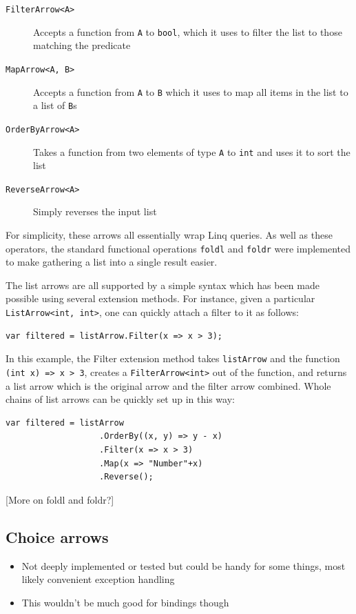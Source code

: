 \documentclass[12pt,twoside,notitlepage]{report}
\begin{document}
\begin{description}
	\item[\texttt{FilterArrow<A>}] Accepts a function from \texttt{A} to \texttt{bool}, which it uses to filter the list to those matching the predicate
	\item[\texttt{MapArrow<A, B>}] Accepts a function from \texttt{A} to \texttt{B} which it uses to map all items in the list to a list of \texttt{B}s
	\item[\texttt{OrderByArrow<A>}] Takes a function from two elements of type \texttt{A} to \texttt{int} and uses it to sort the list
	\item[\texttt{ReverseArrow<A>}] Simply reverses the input list
\end{description}

For simplicity, these arrows all essentially wrap Linq queries. As well as these operators, the standard functional operations \texttt{foldl} and \texttt{foldr} were implemented to make gathering a list into a single result easier.

The list arrows are all supported by a simple syntax which has been made possible using several extension methods. For instance, given a particular \texttt{ListArrow<int, int>}, one can quickly attach a filter to it as follows:

\begin{lstlisting}[language={[Sharp]C}]
var filtered = listArrow.Filter(x => x > 3);
\end{lstlisting}

In this example, the Filter extension method takes \texttt{listArrow} and the function \texttt{(int x) => x > 3}, creates a \texttt{FilterArrow<int>} out of the function, and returns a list arrow which is the original arrow and the filter arrow combined. Whole chains of list arrows can be quickly set up in this way:

\begin{lstlisting}[language={[Sharp]C}]
var filtered = listArrow
                   .OrderBy((x, y) => y - x)
                   .Filter(x => x > 3)
                   .Map(x => "Number"+x)
                   .Reverse();
\end{lstlisting}

[More on foldl and foldr?]

\subsection{Choice arrows}

\begin{itemize}
	\item Not deeply implemented or tested but could be handy for some things, most likely convenient exception handling
	\item This wouldn't be much good for bindings though
\end{itemize}
\end{document}

